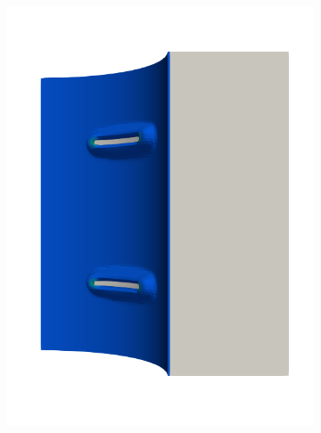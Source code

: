 \begin{frame}
\begin{columns}[T]
\begin{column}{0.6\textwidth}
\begin{figure}
{\begin{subfigure}{0.19\textwidth}
            \includegraphics[width=\textwidth]{examples/figures/seed_ep_2}
          \end{subfigure}
        }
        

\end{figure}
\end{column}
\end{columns}
\end{frame}
